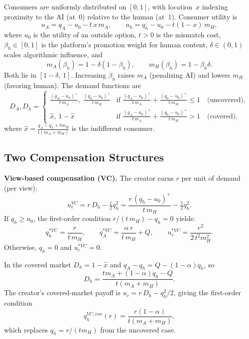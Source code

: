 \documentclass[mnsc,nonblindrev]{informs3_NoOR}
\begin{document}
Consumers are uniformly distributed on $[0,1]$, with location~$x$ indexing proximity to the AI (at~0) relative to the human (at~1). Consumer utility is
\begin{equation}\label{eq:utility}
u_A = q_A - u_0 - t\,x\,m_A, \qquad u_h = q_h - u_0 - t(1-x)\,m_H,
\end{equation}
where $u_0$ is the utility of an outside option, $t > 0$ is the mismatch cost, $\beta_h \in [0,1]$ is the platform's promotion weight for human content, $\delta \in (0,1)$ scales algorithmic influence, and
\begin{equation}\label{eq:mismatch}
m_A(\beta_h) = 1 - \delta(1-\beta_h), \qquad m_H(\beta_h) = 1 - \beta_h\delta.
\end{equation}
Both lie in $[1-\delta,\,1]$. Increasing $\beta_h$ raises $m_A$ (penalizing AI) and lowers $m_H$ (favoring human). The demand functions are
\begin{equation}
        D_A, D_h =
        \begin{cases}
       \frac{(q_A - u_0)^+}{t\,m_A}, \ \frac{(q_h -u_0)^+}{t\,m_H}
        & \text{if } \frac{(q_A - u_0)^+}{t\,m_A} +  \frac{(q_h -u_0)^+}{t\,m_H} \leq 1
        \quad \text{(uncovered)}, \\[1em]
        \hat{x}, \ 1-\hat{x}
        & \text{if } \frac{(q_A - u_0)^+}{t\,m_A} +  \frac{(q_h -u_0)^+}{t\,m_H} > 1
        \quad \text{(covered)}.
        \end{cases}
        \end{equation}
        where $
        \hat{x} = \frac{q_A - q_h + t m_H}{t(m_A + m_H)}
        $
        is the indifferent consumer.
 
\subsection{Two Compensation Structures}
 
\textbf{View-based compensation (VC).} The creator earns $r$ per unit of demand (per view):
\[
u_c^{VC} = r\,D_h - \tfrac{1}{2}q_h^2 = \frac{r\,(q_h - u_0)^+}{t\,m_H} - \tfrac{1}{2}q_h^2.
\]
If $q_h\geq u_0$, the first-order condition $r/(t\,m_H) - q_h = 0$ yields:
\begin{equation}\label{eq:effort-vc}
q_h^{*VC} = \frac{r}{t\,m_H}, \qquad q_A^{*VC} = \frac{\alpha\,r}{t\,m_H} + Q, \qquad u_c^{*VC} = \frac{r^2}{2\,t^2 m_H^2}.
\end{equation}
 Otherwise, $q_h = 0$ and $u_c^{*VC}=0$.


 In the covered market $D_h = 1 - \hat{x}$ and $q_A - q_h = Q - (1-\alpha)q_h$, so
\begin{equation}\label{eq:Dh-covered}
D_h = \frac{tm_A + (1-\alpha)q_h - Q}{t(m_A+m_H)}.
\end{equation}
The creator's covered-market payoff is $u_c = r\,D_h - q_h^2/2$, giving the first-order condition
\begin{equation}\label{eq:VC-covered-stage2}
q_h^{VC,\text{cov}}(r) = \frac{r(1-\alpha)}{t(m_A+m_H)},
\end{equation}
which replaces $q_h = r/(tm_H)$ from the uncovered case.
\end{document}
